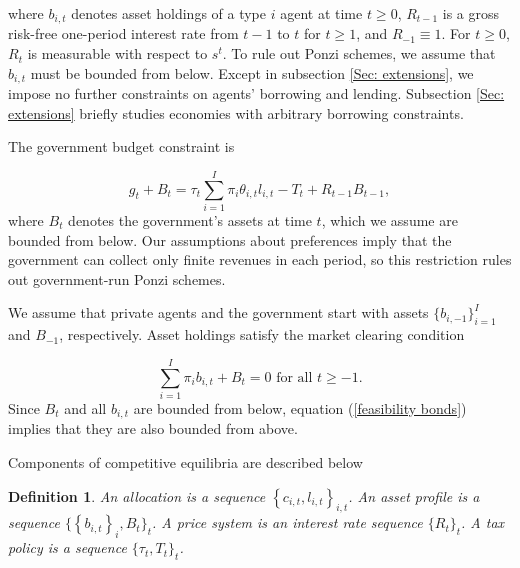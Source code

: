 \documentclass[thmsb,11pt]{article}
\newtheorem{definition}{Definition}
\begin{document}
\noindent where $b_{i,t}$ denotes asset holdings of a type $i$ agent  at time $t\geq 0$, $%
R_{t-1}$ is a gross risk-free one-period interest rate from  $t-1$ to
 $t$ for $t\geq 1$, and $R_{-1}\equiv 1$. For $t\geq 0$, $R_{t}$ is
measurable with respect to $s^t$. To rule out Ponzi schemes,
we assume that $b_{i,t}$ must be bounded from below. Except in subsection \ref{Sec: extensions}, we
impose no further constraints on agents'  borrowing  and lending. Subsection \ref{Sec: extensions} briefly studies economies with
arbitrary borrowing constraints.

The government budget constraint is%

\begin{equation}
g_{t}+B_{t}=\tau _{t}\sum_{i=1}^{I}\pi _{i}\theta
_{i,t}l_{i,t}-T_{t}+R_{t-1}B_{t-1},  \label{govmt bc affine}
\end{equation}%
where $B_{t}$ denotes the government's assets at time $t$, which we assume
are bounded from below. Our assumptions about preferences
imply that the government can collect only finite revenues in each period, so
this restriction rules out government-run Ponzi schemes.

We assume that private agents and the government start with  assets $%
\{b_{i,-1}\}_{i=1}^{I}$ and $B_{-1}$, respectively.  Asset holdings
satisfy the market clearing condition%

\begin{equation}
\sum_{i=1}^{I}\pi _{i}b_{i,t}+B_{t}=0\text{ for all }t\geq -1.
\label{feasibility bonds}
\end{equation}%
Since $B_{t}$ and all $b_{i,t}$ are bounded from below,  equation (\ref{feasibility bonds}) implies that they are also bounded from above.


Components of  competitive  equilibria are described below

\begin{definition}
\label{Def:components} An \emph{allocation} is a sequence $\left \{
c_{i,t},l_{i,t}\right \} _{i,t}$. An \emph{asset profile} is a sequence $\{
\left \{ b_{i,t}\right \} _{i},B_{t}\}_{t}$. A \emph{price system} is an
interest rate sequence $\{R_{t}\}_{t}$. A \emph{tax policy} is a sequence $%
\{ \tau _{t},T_{t}\}_{t}$.
\end{definition}
%
\end{document}
